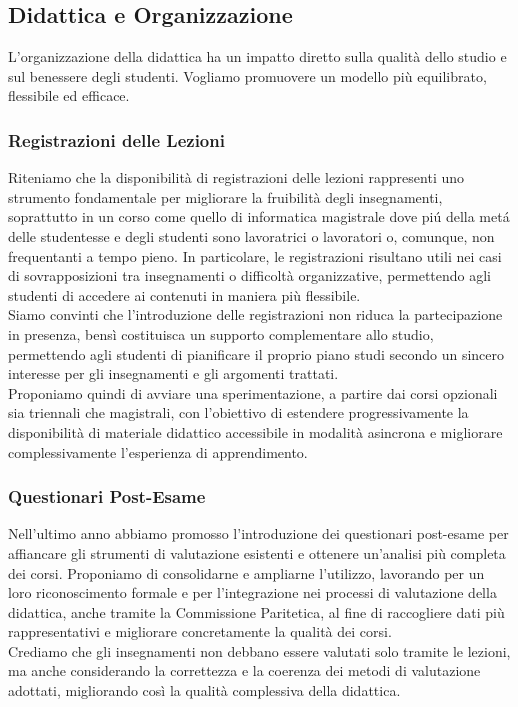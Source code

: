 \documentclass[12pt,a4paper]{article}
\begin{document}
\subsection{Didattica e Organizzazione}
L’organizzazione della didattica ha un impatto diretto sulla qualità dello studio e sul benessere degli studenti. Vogliamo promuovere un modello più equilibrato, flessibile ed efficace.
\subsubsection{Registrazioni delle Lezioni}
Riteniamo che la disponibilità di registrazioni delle lezioni rappresenti uno strumento fondamentale per migliorare la fruibilità degli insegnamenti, soprattutto in un corso come quello di informatica magistrale dove piú della metá delle studentesse e degli studenti sono lavoratrici o lavoratori o, comunque, non frequentanti a tempo pieno. In particolare, le registrazioni  risultano utili nei casi di sovrapposizioni tra insegnamenti o difficoltà organizzative, permettendo agli studenti di accedere ai contenuti in maniera più flessibile.
\\ Siamo convinti che l’introduzione delle registrazioni non riduca la partecipazione in presenza, bensì costituisca un supporto complementare allo studio, permettendo agli studenti di pianificare il proprio piano studi secondo un sincero interesse per gli insegnamenti e gli argomenti trattati.
\\ Proponiamo quindi di avviare una sperimentazione, a partire dai corsi opzionali sia triennali che magistrali, con l’obiettivo di estendere progressivamente la disponibilità di materiale didattico accessibile in modalità asincrona e migliorare complessivamente l’esperienza di apprendimento.

\subsubsection{Questionari Post-Esame}
Nell’ultimo anno abbiamo promosso l’introduzione dei questionari post-esame per affiancare gli strumenti di valutazione esistenti e ottenere un’analisi più completa dei corsi. Proponiamo di consolidarne e ampliarne l’utilizzo, lavorando per un loro riconoscimento formale e per l’integrazione nei processi di valutazione della didattica, anche tramite la Commissione Paritetica, al fine di raccogliere dati più rappresentativi e migliorare concretamente la qualità dei corsi.\\Crediamo che gli insegnamenti non debbano essere valutati solo tramite le lezioni, ma anche considerando la correttezza e la coerenza dei metodi di valutazione adottati, migliorando così la qualità complessiva della didattica.
\end{document}
